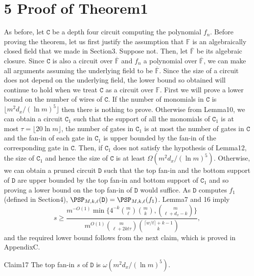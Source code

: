 \section*{5 Proof of Theorem1}
As before, let $\mathtt C$ be a depth four circuit computing the polynomial $f_n$. Before proving the theorem, let us first justify the assumption that $\mathbb F$ is an algebraically closed field that we made in Section3. Suppose not. Then, let $\overline{\mathbb F}$ be its algebraic closure. Since $\mathtt C$ is also a circuit over $\overline{\mathbb F}$ and $f_n$ a polynomial over $\overline{\mathbb F}$, we can make all arguments assuming the underlying field to be $\overline{\mathbb F}$. Since the size of a circuit does not depend on the underlying field, the lower bound so obtained will continue to hold when we treat $\mathtt C$ as a circuit over $\mathbb F$.
First we will prove a lower bound on the number of wires of $\mathtt C$. If the number of monomials in $\mathtt C$ is $\lfloor m^2d_x/(\ln m)^5\rfloor$ then there is nothing to prove. Otherwise from Lemma10, we can obtain a circuit $\mathtt C_1$ such that the support of all the monomials of $\mathtt C_1$ is at most $\tau=\lfloor20\ln m\rfloor$, the number of gates in $\mathtt C_1$ is at most the number of gates in $\mathtt C$ and the fan-in of each gate in $\mathtt C_1$ is upper bounded by the fan-in of the corresponding gate in $\mathtt C$. Then, if $\mathtt C_1$ does not satisfy the hypothesis of Lemma12, the size of $\mathtt C_1$ and hence the size of $\mathtt C$ is at least $\Omega(m^2d_x/(\ln m)^5)$. Otherwise, we can obtain a pruned circuit $\mathtt D$ such that the top fan-in and the bottom support of $\mathtt D$ are upper bounded by the top fan-in and bottom support of $\mathtt C_1$ and so proving a lower bound on the top fan-in of $\mathtt D$ would suffice.
As $\mathtt D$ computes $f_1$ (defined in Section4), $\PSP_{M,k,\ell}(\mathtt D)=\PSP_{M,k,\ell}(f_1)$. Lemma7 and 16 imply
\begin{equation}
s\ge\frac{m^{-O(1)}\min\{4^{-k}\binom m\ell\binom mk,\binom m{\ell+d_x-k}\}}
{m^{O(1)}\binom m{\ell+2kt\tau}\binom{\lceil w/t\rceil+k-1}k},\tag{1}
\end{equation}
and the required lower bound follows from the next claim, which is proved in AppendixC.
\begin{authorclaim}{Claim17}
The top fan-in $s$ of $\mathtt D$ is $\omega(m^2d_x/(\ln m)^5)$.
\end{authorclaim}
